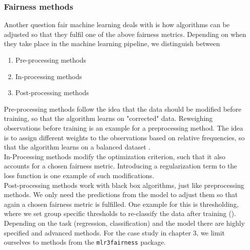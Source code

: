 \subsubsection*{Fairness methods}
Another question fair machine learning deals with is how algorithms can be adjusted so that they fulfil one of the above fairness metrics.
Depending on when they take place in the machine learning pipeline, we distinguish between
\begin{enumerate}
    \item Pre-processing methods
    \item In-processing methods
    \item Post-processing methods
\end{enumerate}
Pre-processing methods follow the idea that the data should be modified before training, so that the algorithm learns on "corrected" data. Reweighing observations before training is an example for a preprocessing method. The idea is to assign different weights to the observations based on relative frequencies, so that the algorithm learns on a balanced dataset \cite{caton2024}.\\
In-Processing methods modify the optimization criterion, such that it also accounts for a chosen fairness metric. Introducing a regularization term to the loss function is one example of such modifications.\\
Post-processing methods work with black box algorithms, just like preprocessing methods. We only need the predictions from the model to adjust them so that again a chosen fairness metric is fulfilled. One example for this is thresholding, where we set group specific thresholds to re-classify the data after training (\cite{hardt2016}).
Depending on the task (regression, classification) and the model there are highly specified and advanced methods. For the case study in chapter 3, we limit ourselves to methods from the \texttt{mlr3fairness} package.

